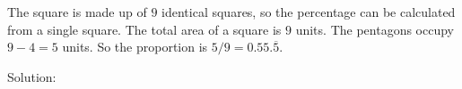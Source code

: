 The square is made up of $9$ identical squares, so the percentage can be calculated from a single square. The total area of a square is $9$ units. The pentagons occupy $9-4=5$ units. So the proportion is $5/9=0.55.\overline{5}$.

Solution: 